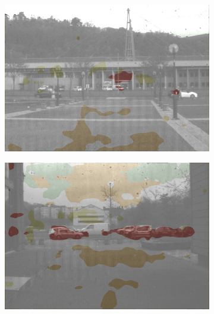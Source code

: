 \begin{figure}[h]
\begin{subfigure}[b]{0.18\linewidth}
	\end{subfigure}
	
	\vspace{0.1cm}  
	
	\begin{subfigure}[b]{0.18\linewidth}   
		\centering 
		\includegraphics[width=\linewidth]{Figures/Aug/BA2/selected_images/overlayed/over1205.jpg}
	\end{subfigure}
	\begin{subfigure}[b]{0.18\linewidth}
		\centering
		\includegraphics[width=\linewidth]{Figures/Aug/BA2/selected_images/overlayed/over4427.jpg}
	\end{subfigure}
	\begin{subfigure}[b]{0.18\linewidth}  
		\centering 

\end{subfigure}
\end{figure}

